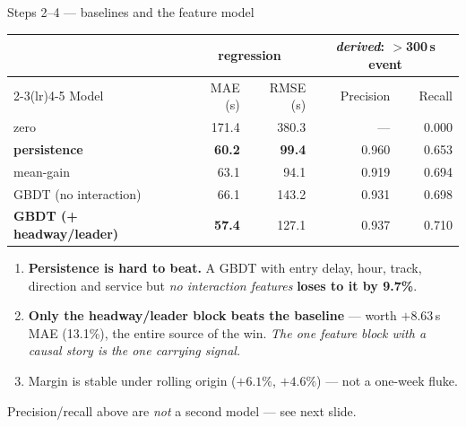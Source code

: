 \documentclass[aspectratio=169,10pt]{beamer}
\newcommand{\srcnote}[1]{{\scriptsize\color{ink3}#1}}
\newcommand{\hl}[1]{{\color{corange}\textbf{#1}}}
\begin{document}
\begin{frame}{Steps 2--4 --- baselines and the feature model}
  \centering
  \begin{tabular}{@{}lrrrr@{}}
    \toprule
    & \multicolumn{2}{c}{\textbf{regression}} & \multicolumn{2}{c}{\color{ink3}\emph{derived}: $>$300\,s event} \\
    \cmidrule(lr){2-3}\cmidrule(lr){4-5}
    Model & MAE (s) & RMSE (s) & Precision & Recall \\
    \midrule
    zero & 171.4 & 380.3 & --- & 0.000 \\
    \textbf{persistence} & \textbf{60.2} & \textbf{99.4} & 0.960 & 0.653 \\
    mean-gain & 63.1 & 94.1 & 0.919 & 0.694 \\
    GBDT (no interaction) & 66.1 & 143.2 & 0.931 & 0.698 \\
    \textbf{GBDT (+ headway/leader)} & \textbf{57.4} & 127.1 & 0.937 & 0.710 \\
    \bottomrule
  \end{tabular}

  \vspace{1em}
  \raggedright
  \begin{enumerate}\small
    \item \textbf{Persistence is hard to beat.} A GBDT with entry delay, hour, track,
      direction and service but \emph{no interaction features} \hl{loses to it by 9.7\%}.
    \item \textbf{Only the headway/leader block beats the baseline} --- worth $+8.63$\,s MAE
      (13.1\%), the entire source of the win. \emph{The one feature block with a causal story
      is the one carrying signal.}
    \item Margin is stable under rolling origin ($+6.1\%$, $+4.6\%$) --- not a one-week fluke.
  \end{enumerate}

  \vspace{0.3em}
  \srcnote{Precision/recall above are \emph{not} a second model --- see next slide.}
\end{frame}
\end{document}
